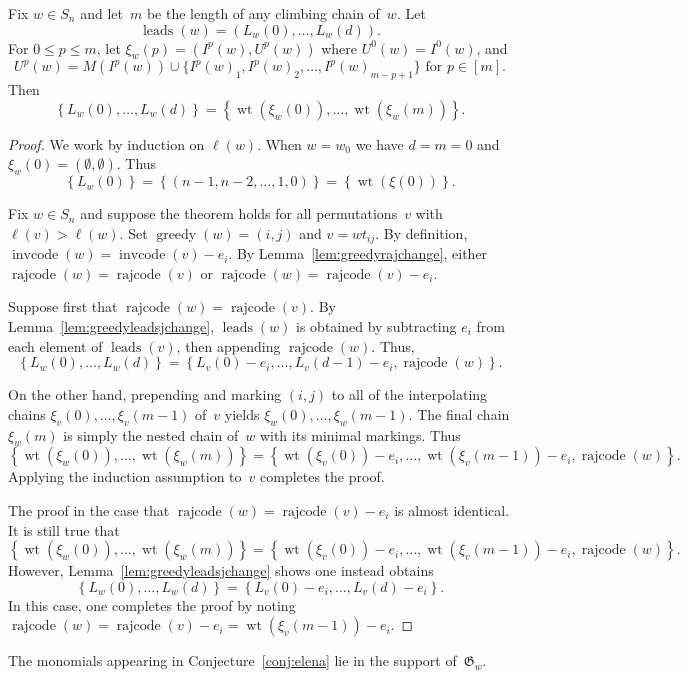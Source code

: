 \documentclass[ALCO]{cedram}
\DeclareMathOperator{\greedy}{\mathrm{greedy}}
\DeclareMathOperator{\leads}{\mathrm{leads}}
\DeclareMathOperator{\wt}{\mathrm{wt}}
\DeclareMathOperator{\cc}{\mathrm{invcode}}
\DeclareMathOperator{\rr}{\mathrm{rajcode}}
\begin{document}
\begin{theorem}
	\label{thm:interpolatingchainsexponents}
	Fix $w\in S_n$ and let~$m$ be the length of any climbing chain of~$w$. Let
	\[\leads(w)=(L_w(0),\ldots,L_w(d)).\] 
	For $0\leq p\leq m$, let $\xi_w(p)=(I^p(w),U^p(w))$ where $U^0(w) = I^0(w)$, and
	\[U^p(w) = M(I^p(w))\cup \{I^p(w)_1,I^p(w)_2,\ldots,I^p(w)_{m-p+1} \}\mbox{ for } p\in [m].\]
	Then 
	\[\left\{{L_w(0)},\ldots, {L_w(d)}\right\} = \left\{\wt({\xi_w(0)}),\ldots,\wt({\xi_w(m)}) \right\}. \]
\end{theorem}
\begin{proof}
	We work by induction on $\ell(w)$. When $w=w_0$ we have $d=m=0$ and $\xi_w(0) = (\emptyset,\emptyset)$. Thus
	\[\left\{ {L_w(0)}\right\} = \left\{(n-1,n-2,\ldots,1,0)\right\} = \left\{\wt({\xi(0)})\right\}. \] 
	
	Fix $w\in S_n$ and suppose the theorem holds for all permutations~$v$ with $\ell(v)>\ell(w)$. Set $\greedy(w)=(i,j)$ and $v=wt_{ij}$. By definition, $\cc(w)=\cc(v)-e_i$. By Lemma~\ref{lem:greedyrajchange}, either $\rr(w) = \rr(v)$ or $\rr(w) = \rr(v) - e_i$. 
	
	Suppose first that $\rr(w) = \rr(v)$. By Lemma~\ref{lem:greedyleadsjchange}, $\leads(w)$ is obtained by subtracting $e_i$ from each element of $\leads(v)$, then appending $\rr(w)$.
	Thus,
	\[\left\{{L_w(0)},\ldots, {L_w(d)}\right\} = \left\{{L_v(0)}-e_i,\ldots, {L_v(d-1)}-e_i, \rr(w)\right\}.\]
	
	On the other hand, prepending and marking $(i,j)$ to all of the interpolating chains 
	$\xi_v(0),\ldots,\xi_v(m-1)$ of~$v$ yields $\xi_w(0),\ldots, \xi_w(m-1)$. The final chain $\xi_w(m)$ is simply the nested chain of~$w$ with its minimal markings. Thus
	\[\left\{\wt({\xi_w(0)}),\ldots,\wt({\xi_w(m)}) \right\} = \left\{\wt({\xi_v(0)})-e_i,\ldots,\wt({\xi_v(m-1)})-e_i,\rr(w) \right\}.\]
	Applying the induction assumption to~$v$ completes the proof.
	
	The proof in the case that $\rr(w) = \rr(v) - e_i$ is almost identical. It is still true that
	\[\left\{\wt({\xi_w(0)}),\ldots,\wt({\xi_w(m)}) \right\} = \left\{\wt({\xi_v(0)})-e_i,\ldots,\wt({\xi_v(m-1)})-e_i,\rr(w) \right\}.\]
	However, Lemma~\ref{lem:greedyleadsjchange} shows one instead obtains
	\[\left\{{L_w(0)},\ldots, {L_w(d)}\right\} = \left\{{L_v(0)}-e_i,\ldots, {L_v(d)}-e_i\right\}.\]
	In this case, one completes the proof by noting $\rr(w) =\rr(v)-e_i= \wt({\xi_v(m-1)})-e_i$.
\end{proof}

\begin{corollary} 
	\label{cor:exist} 
	The monomials appearing in Conjecture~\ref{conj:elena} lie in the support of~$\mathfrak{G}_w$.
\end{corollary}
\end{document}
